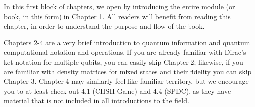 \begin{partintro}
In this first block of chapters, we open by introducing the entire module (or book, in this form) in Chapter 1.  All readers will benefit from reading this chapter, in order to understand the purpose and flow of the book.

Chapters 2-4 are a very brief introduction to quantum information and quantum computational notation and operations.  If you are already familiar with Dirac's ket notation for multiple qubits, you can easily skip Chapter 2; likewise, if you are familiar with density matrices for mixed states and their fidelity you can skip Chapter 3. Chapter 4 may similarly feel like familiar territory, but we encourage you to at least check out 4.1 (CHSH Game) and 4.4 (SPDC), as they have material that is not included in all introductions to the field.
\end{partintro}
